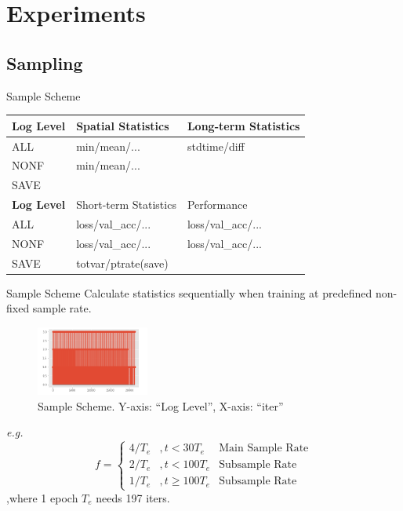 \documentclass[notes]{beamer}
\newcommand{\liuhao}{\fontsize{7.875pt}{\baselineskip}\selectfont}  %
\begin{document}
\section{Experiments}
\subsection{Sampling}

\begin{frame}{Sample Scheme}
		\begin{longtable}{l||ll}
				\textbf{Log Level} & Spatial Statistics  & Long-term Statistics \\ \hline 
				ALL                  & min/mean/...        & stdtime/diff         \\
				NONF                 & min/mean/...        &                      \\
				SAVE                 &                     &                      \\ \hline \hline 
				\textbf{Log Level} & Short-term Statistics         & Performance          \\ \hline
				ALL                  & loss/val\_acc/...   & loss/val\_acc/...    \\
				NONF                 & loss/val\_acc/...   & loss/val\_acc/...    \\
				SAVE                 & totvar/ptrate(save) &                
		\end{longtable} 
        \liuhao{Spatial Statistics: reduced from one tensor of one timestamp. 
        
        Long-term Statistic: accumulate from the beginning of the training process.
        
        Short-term Statistic: open a windows to observe.
        } 
\end{frame}

\begin{frame}{Sample Scheme}
Calculate statistics sequentially when training at predefined non-fixed sample rate. 
    \begin{figure}
    \includegraphics[width=0.33\textwidth]{sample_how.png} 
    \caption{Sample Scheme. Y-axis: ``Log Level'', X-axis: ``iter''}
    \end{figure}
   \textit{e.g.}
   $$f= \left\{ 
       \begin{array}{lll} 4/T_{e} &, t < 30T_{e} & \text{Main Sample Rate} \\ 2/T_{e} &,t < 100T_e & \text{Subsample Rate}  \\ 1/T_e &, t \ge 100T_e & \text{Subsample Rate} \end{array}
       \right. $$ 
       ,where  1 epoch  $T_e $ needs 197 iters. 
\end{frame}
\end{document}
